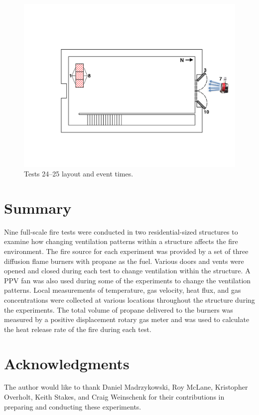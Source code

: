 \documentclass[12pt,oneside]{book}
\begin{document}
\begin{figure}[!ht]
\begin{minipage}[b]{0.9\columnwidth}
	\includegraphics[width=0.95\columnwidth]{../Figures/Floor_Plans/West_Structure_1st_Floor_Test_24}
\end{minipage}
\caption{Tests 24--25 layout and event times.}
\label{fig:west_test_24}
\end{figure}
\clearpage

\chapter{Summary}
\label{chap:Summary}
Nine full-scale fire tests were conducted in two residential-sized structures to examine how changing ventilation patterns within a structure affects the fire environment. The fire source for each experiment was provided by a set of three diffusion flame burners with propane as the fuel. Various doors and vents were opened and closed during each test to change ventilation within the structure. A PPV fan was also used during some of the experiments to change the ventilation patterns. Local measurements of temperature, gas velocity, heat flux, and gas concentrations were collected at various locations throughout the structure during the experiments. The total volume of propane delivered to the burners was measured by a positive displacement rotary gas meter and was used to calculate the heat release rate of the fire during each test.


\chapter*{Acknowledgments}
\label{chap:acknowledgments}
The author would like to thank Daniel Madrzykowski, Roy McLane, Kristopher Overholt, Keith Stakes, and Craig Weinschenk for their contributions in preparing and conducting these experiments.



\appendix
\end{document}
